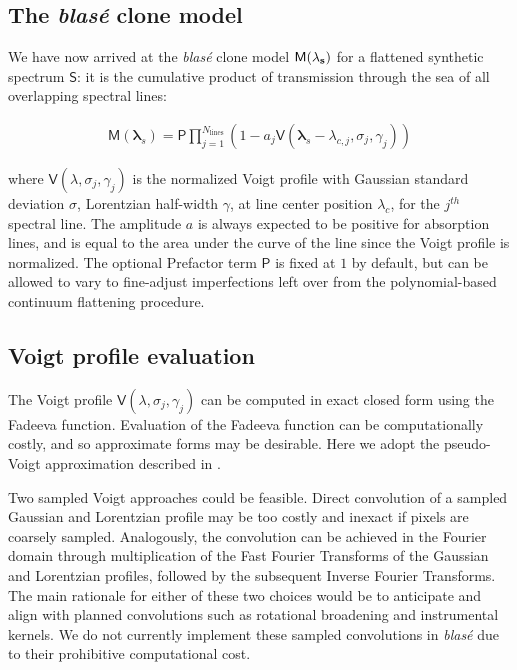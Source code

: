 \documentclass[modern]{aastex631}
\begin{document}
\subsection{The \emph{blas\'e} clone model}

We have now arrived at the \emph{blas\'e} clone model $\mathsf{M}(\bf{\lambda}_s)$ for a flattened synthetic spectrum $\mathsf{S}$: it is the cumulative product of transmission through the sea of all overlapping spectral lines:

\begin{eqnarray}
  \mathsf{M}(\bm{\lambda}_s) = {\displaystyle \mathsf{P} \prod_{j=1}^{N_{\mathrm{lines}}}  (1-a_j \mathsf{V}(\bm{\lambda}_s-\lambda_{c,j}, \sigma_j, \gamma_j) )} \label{equation1}
\end{eqnarray}

where $\mathsf{V}(\lambda, \sigma_j, \gamma_j)$ is the normalized Voigt profile with Gaussian standard deviation $\sigma$, Lorentzian half-width $\gamma$, at line center position $\lambda_c$, for the $j^{th}$ spectral line.  The amplitude $a$ is always expected to be positive for absorption lines, and is equal to the area under the curve of the line since the Voigt profile is normalized.  The optional Prefactor term $\mathsf{P}$ is fixed at $1$ by default, but can be allowed to vary to fine-adjust imperfections left over from the polynomial-based continuum flattening procedure.

\subsection{Voigt profile evaluation}
The Voigt profile $\mathsf{V}(\lambda, \sigma_j, \gamma_j)$ can be computed in exact closed form using the Fadeeva function.  Evaluation of the Fadeeva function can be computationally costly, and so approximate forms may be desirable.  Here we adopt the pseudo-Voigt approximation described in .

Two sampled Voigt approaches could be feasible.  Direct convolution of a sampled Gaussian and Lorentzian profile may be too costly and inexact if pixels are coarsely sampled.  Analogously, the convolution can be achieved in the Fourier domain through multiplication of the Fast Fourier Transforms of the Gaussian and Lorentzian profiles, followed by the subsequent Inverse Fourier Transforms.  The main rationale for either of these two choices would be to anticipate and align with planned convolutions such as rotational broadening and instrumental kernels.  We do not currently implement these sampled convolutions in \emph{blas\'e} due to their prohibitive computational cost.
\end{document}
